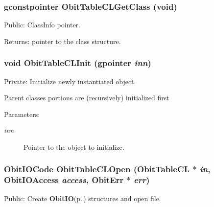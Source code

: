 \subsubsection{\setlength{\rightskip}{0pt plus 5cm}gconstpointer Obit\-Table\-CLGet\-Class (void)}\label{ObitTableCL_8c_a17}


Public: Class\-Info pointer. 

\begin{Desc}
\item[Returns:]pointer to the class structure. \end{Desc}
\subsubsection{\setlength{\rightskip}{0pt plus 5cm}void Obit\-Table\-CLInit (gpointer {\em inn})}\label{ObitTableCL_8c_a8}


Private: Initialize newly instantiated object. 

Parent classes portions are (recursively) initialized first \begin{Desc}
\item[Parameters:]
\begin{description}
\item[{\em inn}]Pointer to the object to initialize. \end{description}
\end{Desc}
\subsubsection{\setlength{\rightskip}{0pt plus 5cm}Obit\-IOCode Obit\-Table\-CLOpen ({\bf Obit\-Table\-CL} $\ast$ {\em in}, Obit\-IOAccess {\em access}, {\bf Obit\-Err} $\ast$ {\em err})}\label{ObitTableCL_8c_a21}


Public: Create {\bf Obit\-IO}{\rm (p.\,\pageref{structObitIO})} structures and open file. 

